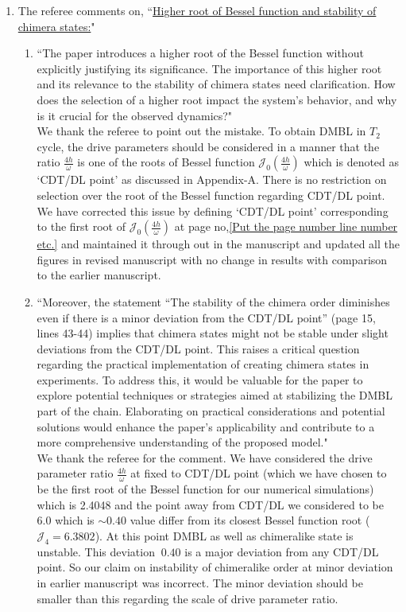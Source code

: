 \documentclass[10pt,
superscriptaddress,
amsmath,amssymb,showkeys,
aps, 
prb,
]{revtex4-2}
\newcommand{\response}[1]{{\color{black}#1}} %
\newcommand{\comment}[1]{{\color{blue}#1}} %
\begin{document}
\begin{enumerate}
\begin{enumerate}
{		
		}
		\item The referee comments on, \comment{``\underline{Higher root of Bessel function and stability of chimera states:}"}\\
		\begin{enumerate}
			\item \comment{``The paper introduces a higher root of the Bessel function without explicitly justifying its significance. The importance of this higher root and its relevance to the stability
				of chimera states need clarification. How does the selection of a higher root impact the system's behavior, and why is it crucial for the observed dynamics?"}\\
			
			\response{We thank the referee to point out the mistake. To obtain DMBL in $T_2$ cycle, the drive parameters should be considered in a manner that the ratio $\frac{4h}{\omega}$ is one of the roots of Bessel function $\mathcal{J}_0\left(\frac{4h}{\omega}\right)$ which is denoted as `CDT/DL point' as discussed in Appendix-A. There is no restriction on selection over the root of the Bessel function regarding CDT/DL point. We have corrected this issue by defining `CDT/DL point' corresponding to the first root of $\mathcal{J}_0\left(\frac{4h}{\omega}\right)$ at page no,\ref{Put the page number line number etc.} and maintained it through out in the manuscript and updated all the figures in revised manuscript with no change in results with comparison to the earlier manuscript. 
			}
		
			\item \comment{``Moreover, the statement “The stability of the chimera order diminishes even if there is a minor deviation from the CDT/DL point” (page 15, lines 43-44) implies that chimera states might not be stable under slight deviations from the CDT/DL point. This raises a critical question regarding the practical implementation of creating chimera states in experiments. To address this, it would be valuable for the paper to explore potential techniques or strategies aimed at stabilizing the DMBL part of the chain. Elaborating on practical considerations and potential solutions would enhance the paper's applicability and contribute to a more comprehensive understanding of the proposed model."}\\
			
			\response{We thank the referee for the comment. We have considered the drive parameter ratio $\frac{4h}{\omega}$ at fixed to CDT/DL point (which we have chosen to be the first root of the Bessel function for our numerical simulations) which is 2.4048 and the point away from CDT/DL we considered to be 6.0 which is $\sim0.40$ value differ from its closest Bessel function root ($\mathcal{J}_4 =6.3802$). At this point DMBL as well as chimeralike state is unstable. This deviation $~0.40$ is a major deviation from any CDT/DL point. So our claim on instability of chimeralike order at minor deviation in earlier manuscript was incorrect. The minor deviation should be smaller than this regarding the scale of drive parameter ratio. \\
				
}
\end{enumerate}
\end{enumerate}
\end{enumerate}
\end{document}

